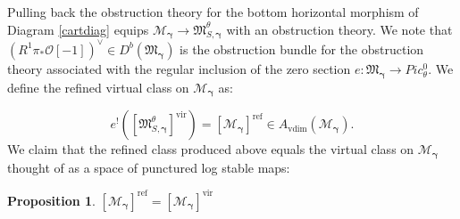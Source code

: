 \documentclass[12pt, oneside]{amsart}   	%
\newcounter{thm}
\newtheorem{proposition}[thm]{Proposition}
\newcommand{\vir}{\operatorname{vir}}
\newcommand{\rf}{\operatorname{ref}}
\newcommand{\vdim}{\operatorname{vdim}}
\numberwithin{equation}{section}
\numberwithin{thm}{section}
\numberwithin{figure}{section}
\begin{document}
Pulling back the obstruction theory for the bottom horizontal morphism of Diagram \ref{cartdiag} equips $\mathscr{M}_{\pmb\gamma} \rightarrow \mathfrak{M}_{S,\pmb\gamma}^\theta$ with an obstruction theory. We note that $(R^1\pi_*\mathcal{O}[-1])^\vee \in D^{b}(\mathfrak{M}_{\pmb\gamma})$ is the obstruction bundle for the obstruction theory associated with the regular inclusion of the zero section $e: \mathfrak{M}_{\pmb\gamma} \rightarrow Pic^{0}_{\theta}$. We define the refined virtual class on $\mathscr{M}_{\pmb\gamma}$ as:

%

\[e^!([\mathfrak{M}_{S,\pmb\gamma}^\theta]^{\vir}) = [\mathscr{M}_{\pmb\gamma}]^{\rf} \in A_{\vdim}(\mathscr{M}_{\pmb\gamma}).\] 
We claim that the refined class produced above equals the virtual class on $\mathscr{M}_{\pmb\gamma}$ thought of as a space of punctured log stable maps:

\begin{proposition}\label{comp}
$[\mathscr{M}_{\pmb\gamma}]^{\rf} = [\mathscr{M}_{\pmb\gamma}]^{\vir}$
\end{proposition}
\end{document}
